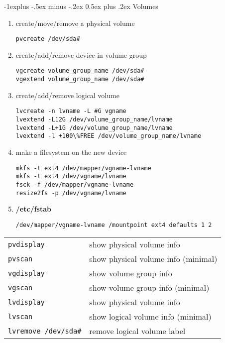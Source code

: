 \documentclass[10pt,landscape]{article}
\makeatletter
\renewcommand{\subsection}{\@startsection{subsection}{2}{0mm}%
                                {-1explus -.5ex minus -.2ex}%
                                {0.5ex plus .2ex}%
                                {\normalfont\normalsize\bfseries}}
\makeatother
\begin{document}
\begin{multicols}{3}
\subsection{Volumes}
\begin{enumerate}
\item create/move/remove a physical volume 
\begin{verbatim}
pvcreate /dev/sda#
\end{verbatim}
\item create/add/remove device in volume group
\begin{verbatim}
vgcreate volume_group_name /dev/sda#
vgextend volume_group_name /dev/sda#
\end{verbatim}
\item create/add/remove logical volume
\begin{verbatim}
lvcreate -n lvname -L #G vgname
lvextend -L12G /dev/volume_group_name/lvname
lvextend -L+1G /dev/volume_group_name/lvname
lvextend -l +100\%FREE /dev/volume_group_name/lvname
\end{verbatim}
\item make a filesystem on the new device
\begin{verbatim}
mkfs -t ext4 /dev/mapper/vgname-lvname
mkfs -t ext4 /dev/vgname/lvname
fsck -f /dev/mapper/vgname-lvname
resize2fs -p /dev/vgname/lvname
\end{verbatim}
\item \textbf{/etc/fstab}
\begin{verbatim}
/dev/mapper/vgname-lvname /mountpoint ext4 defaults 1 2
\end{verbatim}
\end{enumerate}
\begin{tabular}{@{}ll@{}}
\texttt{pvdisplay}                                     & show physical volume info\\
\texttt{pvscan}                                        & show physical volume info (minimal)\\
\texttt{vgdisplay}                                     & show volume group info\\
\texttt{vgscan}                                        & show volume group info (minimal)\\
\texttt{lvdisplay}                                     & show physical volume info\\
\texttt{lvscan}                                        & show logical volume info (minimal)\\
\texttt{lvremove /dev/sda\#}                           & remove logical volume label\\

\end{tabular}
\end{multicols}
\end{document}
